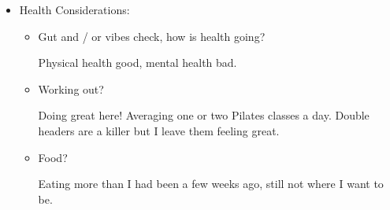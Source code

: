 \documentclass[12pt]{article}
\renewcommand{\,}{\textsuperscript{,}}
\begin{document}
\begin{itemize}
\begin{itemize}
\begin{itemize}
\end{itemize}

\item Outreach:

\begin{itemize}

\item How's outreach going?

Nonexistent. I did get an email recently though.

\item How goes prep for the rest of your life?

Need to do more of that.

\item How goes prep / submission of workshops?

... whoop

\item Any talks coming?

Nope!

\item Upon reflection, how goes outreach? Anything missed in those three questions?

I need to do more again.

\end{itemize}

\item Upon reflection, how is creation going?

Generally decently.
Also crocheted a few balls recently, and in doing so I managed to convince some people to buy memory foam scrap.
Also made a flower for a bartender.


\end{itemize}

\item Health Considerations:

\begin{itemize}

\item Gut and / or vibes check, how is health going?

Physical health good, mental health bad.

\item Working out?

Doing great here! Averaging one or two Pilates classes a day.
Double headers are a killer but I leave them feeling great.

\item Food?

Eating more than I had been a few weeks ago, still not where I want to be.


\end{itemize}
\end{itemize}
\end{document}

